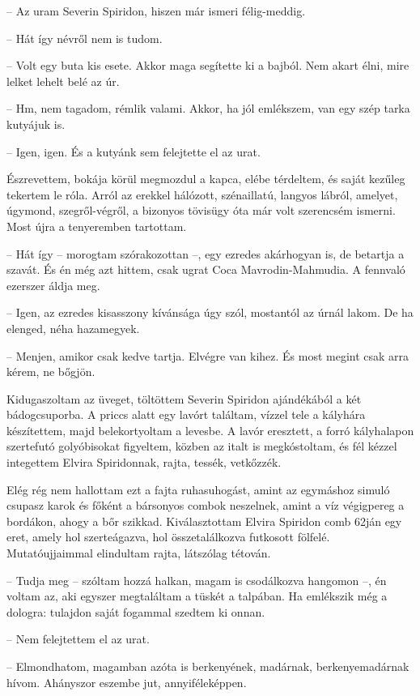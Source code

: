 \documentclass{IEEEtran}
\begin{document}
– Az uram Severin Spiridon, hiszen már ismeri félig-meddig.

– Hát így névről nem is tudom.

– Volt egy buta kis esete. Akkor maga segítette ki a bajból. Nem akart élni,
mire lelket lehelt belé az úr.

– Hm, nem tagadom, rémlik valami. Akkor, ha jól emlékszem, van egy szép tarka
kutyájuk is.

– Igen, igen. És a kutyánk sem felejtette el az urat.

Észrevettem, bokája körül megmozdul a kapca, elébe térdeltem, és saját kezűleg
tekertem le róla. Arról az erekkel hálózott, szénaillatú, langyos lábról,
amelyet, úgymond, szegről-végről, a bizonyos tövisügy óta már volt szerencsém
ismerni. Most újra a tenyeremben tartottam.

– Hát így – morogtam szórakozottan –, egy ezredes akárhogyan is, de betartja a
szavát. És én még azt hittem, csak ugrat Coca Mavrodin-Mahmudia. A fennvaló
ezerszer áldja meg.

– Igen, az ezredes kisasszony kívánsága úgy szól, mostantól az úrnál lakom. De
ha elenged, néha hazamegyek.

– Menjen, amikor csak kedve tartja. Elvégre van kihez. És most megint csak
arra kérem, ne bőgjön.

Kidugaszoltam az üveget, töltöttem Severin Spiridon ajándékából a két
bádogcsuporba. A priccs alatt egy lavórt találtam, vízzel tele a kályhára
készítettem, majd belekortyoltam a levesbe. A lavór eresztett, a forró
kályhalapon szertefutó golyóbisokat figyeltem, közben az italt is
megkóstoltam, és fél kézzel integettem Elvira Spiridonnak, rajta, tessék,
vetkőzzék.

Elég rég nem hallottam ezt a fajta ruhasuhogást, amint az egymáshoz simuló
csupasz karok és főként a bársonyos combok neszelnek, amint a víz végigpereg a
bordákon, ahogy a bőr szikkad. Kiválasztottam Elvira Spiridon comb 62ján egy
eret, amely hol szerteágazva, hol összetalálkozva futkosott fölfelé.
Mutatóujjaimmal elindultam rajta, látszólag tétován.

– Tudja meg – szóltam hozzá halkan, magam is csodálkozva hangomon –, én voltam
az, aki egyszer megtaláltam a tüskét a talpában. Ha emlékszik még a dologra:
tulajdon saját fogammal szedtem ki onnan.

– Nem felejtettem el az urat.

– Elmondhatom, magamban azóta is berkenyének, madárnak, berkenyemadárnak
hívom. Ahányszor eszembe jut, annyiféleképpen.
\end{document}
